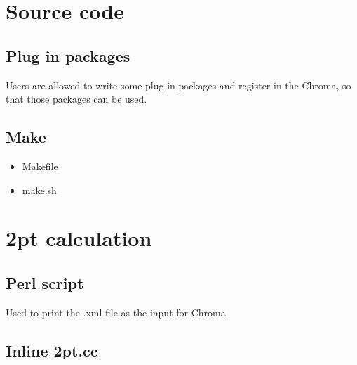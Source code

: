 \documentclass{article}
\begin{document}
\section{Source code}

\subsection{Plug in packages}

Users are allowed to write some plug in packages and register in the Chroma, so that those packages can be used.

\subsection{Make}

\begin{itemize}
    \item Makefile
    \item make.sh 
\end{itemize}

\section{2pt calculation}

\subsection{Perl script}

Used to print the .xml file as the input for Chroma.

\subsection{Inline 2pt.cc}
\end{document}
